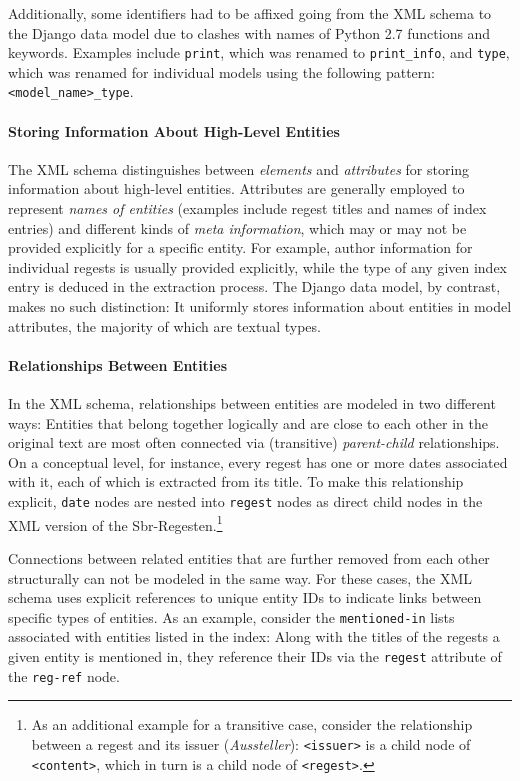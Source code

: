 Additionally, some identifiers had to be affixed going from the XML
schema to the Django data model due to clashes with names of Python
2.7 functions and keywords. Examples include \texttt{print}, which was
renamed to \texttt{print\_info}, and \texttt{type}, which was renamed
for individual models using the following pattern:
\texttt{<model\_name>\_type}.

\paragraph{Storing Information About High-Level Entities}

The XML schema distinguishes between \emph{elements} and
\emph{attributes} for storing information about high-level entities.
Attributes are generally employed to represent \emph{names of
  entities} (examples include regest titles and names of index
entries) and different kinds of \emph{meta information}, which may or
may not be provided explicitly for a specific entity. For example,
author information for individual regests is usually provided
explicitly, while the type of any given index entry is deduced in the
extraction process. The Django data model, by contrast, makes no such
distinction: It uniformly stores information about entities in model
attributes, the majority of which are textual types.

\paragraph{Relationships Between Entities}

In the XML schema, relationships between entities are modeled in two
different ways: Entities that belong together logically and are close
to each other in the original text are most often connected via
(transitive) \emph{parent-child} relationships. On a conceptual level,
for instance, every regest has one or more dates associated with it,
each of which is extracted from its title. To make this relationship
explicit, \texttt{date} nodes are nested into \texttt{regest} nodes as
direct child nodes in the XML version of the Sbr-Regesten.\footnote{As
  an additional example for a transitive case, consider the
  relationship between a regest and its issuer (\emph{Aussteller}):
  \texttt{<issuer>} is a child node of \texttt{<content>}, which in
  turn is a child node of \texttt{<regest>}.}

Connections between related entities that are further removed from
each other structurally can not be modeled in the same way. For these
cases, the XML schema uses explicit references to unique entity IDs to
indicate links between specific types of entities. As an example,
consider the \texttt{mentioned-in} lists associated with entities
listed in the index: Along with the titles of the regests a given
entity is mentioned in, they reference their IDs via the
\texttt{regest} attribute of the \texttt{reg-ref} node.


